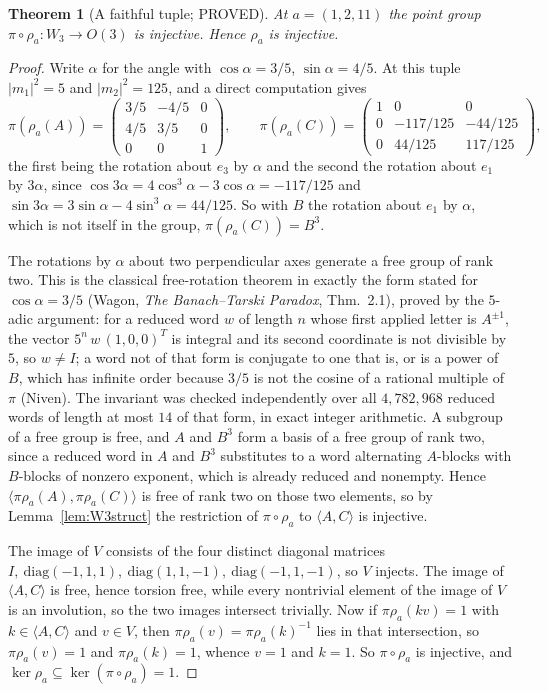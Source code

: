\documentclass[11pt]{article}
\newtheorem{theorem}{Theorem}[section]
\theoremstyle{definition}
\theoremstyle{remark}
\theoremstyle{definition}
\begin{document}
\begin{theorem}[A faithful tuple; PROVED]\label{thm:faithful}
At $a=(1,2,11)$ the point group $\pi\circ\rho_a\colon W_3\to O(3)$ is injective. Hence $\rho_a$ is
injective.
\end{theorem}

\begin{proof}
Write $\alpha$ for the angle with $\cos\alpha=3/5$, $\sin\alpha=4/5$. At this tuple
$|m_1|^2=5$ and $|m_2|^2=125$, and a direct computation gives
\[
 \pi(\rho_a(A))=\begin{pmatrix}3/5&-4/5&0\\4/5&3/5&0\\0&0&1\end{pmatrix},\qquad
 \pi(\rho_a(C))=\begin{pmatrix}1&0&0\\0&-117/125&-44/125\\0&44/125&117/125\end{pmatrix},
\]
the first being the rotation about $e_3$ by $\alpha$ and the second the rotation about $e_1$ by
$3\alpha$, since $\cos3\alpha=4\cos^3\alpha-3\cos\alpha=-117/125$ and
$\sin3\alpha=3\sin\alpha-4\sin^3\alpha=44/125$. So with $B$ the rotation about $e_1$ by $\alpha$,
which is not itself in the group, $\pi(\rho_a(C))=B^3$.

The rotations by $\alpha$ about two perpendicular axes generate a free group of rank two. This is
the classical free-rotation theorem in exactly the form stated for $\cos\alpha=3/5$
\textup{(}Wagon, \emph{The Banach--Tarski Paradox}, Thm.~2.1\textup{)}, proved by the $5$-adic
argument: for a reduced word $w$ of
length $n$ whose first applied letter is $A^{\pm1}$, the vector $5^n\,w\,(1,0,0)^{T}$ is integral
and its second coordinate is not divisible by $5$, so $w\ne I$; a word not of that form is
conjugate to one that is, or is a power of $B$, which has infinite order because $3/5$ is not the
cosine of a rational multiple of $\pi$ (Niven). The invariant was checked independently over all
$4{,}782{,}968$ reduced words of length at most $14$ of that form, in exact integer arithmetic. A
subgroup of a free group is free, and $A$ and $B^3$ form a basis of a free group of rank two,
since a reduced word in $A$ and $B^3$ substitutes to a word alternating $A$-blocks with
$B$-blocks of nonzero exponent, which is already reduced and nonempty. Hence $\langle\pi\rho_a(A),\pi\rho_a(C)\rangle$ is
free of rank two on those two elements, so by Lemma~\ref{lem:W3struct} the restriction of
$\pi\circ\rho_a$ to $\langle A,C\rangle$ is injective.

The image of $V$ consists of the four distinct diagonal matrices
$I,\ \mathrm{diag}(-1,1,1),\ \mathrm{diag}(1,1,-1),\ \mathrm{diag}(-1,1,-1)$, so $V$ injects. The
image of $\langle A,C\rangle$ is free, hence torsion free, while every nontrivial element of the
image of $V$ is an involution, so the two images intersect trivially. Now if
$\pi\rho_a(kv)=1$ with $k\in\langle A,C\rangle$ and $v\in V$, then
$\pi\rho_a(v)=\pi\rho_a(k)^{-1}$ lies in that intersection, so $\pi\rho_a(v)=1$ and
$\pi\rho_a(k)=1$, whence $v=1$ and $k=1$. So $\pi\circ\rho_a$ is injective, and
$\ker\rho_a\subseteq\ker(\pi\circ\rho_a)=1$.
\end{proof}
\end{document}
